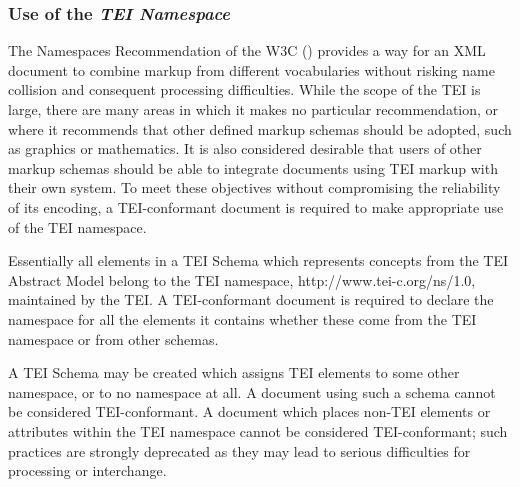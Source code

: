 \subsubsection[{Use of the TEI Namespace}]{Use of the \textit{TEI Namespace}}\label{CFNS}\par
The Namespaces Recommendation of the W3C (\cite{NAMESPACES}) provides a way for an XML document to combine markup from different vocabularies without risking name collision and consequent processing difficulties. While the scope of the TEI is large, there are many areas in which it makes no particular recommendation, or where it recommends that other defined markup schemas should be adopted, such as graphics or mathematics. It is also considered desirable that users of other markup schemas should be able to integrate documents using TEI markup with their own system. To meet these objectives without compromising the reliability of its encoding, a TEI-conformant document is required to make appropriate use of the TEI namespace.\par
Essentially all elements in a TEI Schema which represents concepts from the TEI Abstract Model belong to the TEI namespace, \textsf{http://www.tei-c.org/ns/1.0}, maintained by the TEI. A TEI-conformant document is required to declare the namespace for all the elements it contains whether these come from the TEI namespace or from other schemas.\par
A TEI Schema may be created which assigns TEI elements to some other namespace, or to no namespace at all. A document using such a schema cannot be considered TEI-conformant. A document which places non-TEI elements or attributes within the TEI namespace cannot be considered TEI-conformant; such practices are strongly deprecated as they may lead to serious difficulties for processing or interchange.
